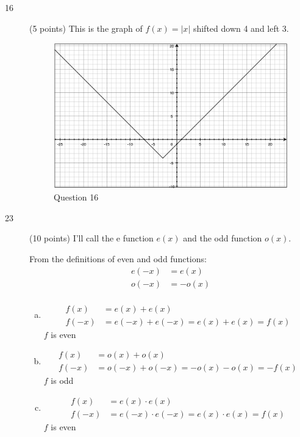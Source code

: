 \documentclass{exam}
\begin{document}
\begin{description}
\item[16] (5 points)
This is the graph of $f(x) = |x|$ shifted down 4 and left 3.

\begin{figure}[H]
  \centering
  \includegraphics[scale=.3]{question_16.eps}
  \caption*{Question 16}
\end{figure}

\pagebreak

\item[23] (10 points)
I'll call the e function $e(x)$ and the odd function $o(x)$.

From the definitions of even and odd functions:
\begin{align*}
  e(-x) &= e(x) \\
  o(-x) &= -o(x) \\
\end{align*}

\begin{enumerate}[(a)]

\item
\begin{align*}
  f(x) &= e(x) + e(x) \\
  f(-x) &= e(-x) + e(-x) = e(x) + e(x) = f(x)
\end{align*}
$f$ is even

\item
\begin{align*}
  f(x) &= o(x) + o(x) \\
  f(-x) &= o(-x) + o(-x) = -o(x) - o(x) = -f(x)
\end{align*}
$f$ is odd

\item
\begin{align*}
  f(x) &= e(x) \cdot e(x) \\
  f(-x) &= e(-x) \cdot e(-x) = e(x) \cdot e(x) = f(x)
\end{align*}
$f$ is even


\end{enumerate}
\end{description}
\end{document}
